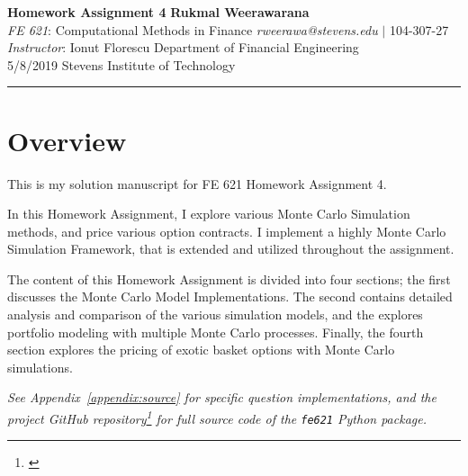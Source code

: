 \documentclass[10pt]{article}
\begin{document}
\thispagestyle{plain}



\noindent
\large\textbf{Homework Assignment 4} \hfill \textbf{Rukmal Weerawarana} \\
\normalsize \textit{FE 621}: Computational Methods in Finance \hfill \textit{rweerawa@stevens.edu} $\mid$ 104-307-27 \\
\textit{Instructor}: Ionut Florescu \hfill Department of Financial Engineering \\
5/8/2019 \hfill Stevens Institute of Technology

\noindent\rule{\linewidth}{.1em}



\section*{Overview}

This is my solution manuscript for FE 621 Homework Assignment 4.

In this Homework Assignment, I explore various Monte Carlo Simulation methods, and price various option contracts. I implement a highly Monte Carlo Simulation Framework, that is extended and utilized throughout the assignment.

The content of this Homework Assignment is divided into four sections; the first discusses the Monte Carlo Model Implementations. The second contains detailed analysis and comparison of the various simulation models, and the explores portfolio modeling with multiple Monte Carlo processes. Finally, the fourth section explores the pricing of exotic basket options with Monte Carlo simulations.

\begin{center}
    \textit{See Appendix~\ref{appendix:source} for specific question implementations, and the project GitHub repository\footnote{\cite{Weerawarana2019}} for full source code of the {\normalfont \texttt{fe621}} Python package.}
\end{center}



\newpage

\tableofcontents
\end{document}
